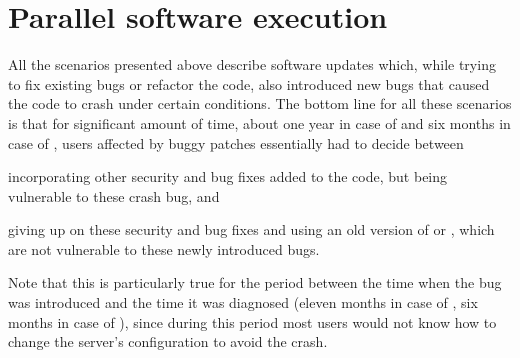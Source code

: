 

\section{Parallel software execution}



All the scenarios presented above describe software updates which, while trying
to fix existing bugs or refactor the code, also introduced new bugs that caused
the code to crash under certain conditions. The bottom line for all these
scenarios is that for significant amount of time, \ie about one year in case of
\lighttpd and six months in case of \redis, users affected by buggy patches
essentially had to decide between%
\begin{inparaenum}[(1)]
\item incorporating other security and bug fixes added to the code, but being
  vulnerable to these crash bug, and
\item giving up on these security and bug fixes and using an old version of
  \lighttpd or \redis, which are not vulnerable to these newly introduced bugs.
\end{inparaenum}
Note that this is particularly true for the period between the time when the
bug was introduced and the time it was diagnosed (\ie eleven months in case of
\lighttpd, six months in case of \redis), since during this period most users
would not know how to change the server's configuration to avoid the crash.

